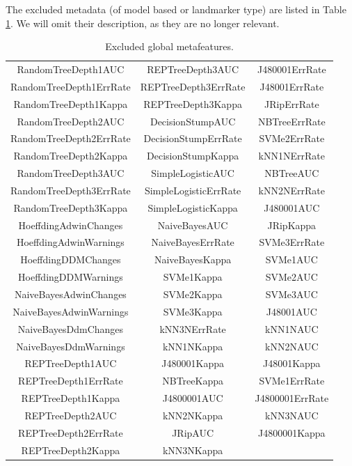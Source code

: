 The excluded metadata (of model based or landmarker type) are listed in Table \ref{table:excludedGlobalMetadata}. We will omit their description, as they are no longer relevant.

 \begin{table} 
 	\caption{Excluded global metafeatures.}
 	\label{table:excludedGlobalMetadata}
 	\centering 
 	\renewcommand{\arraystretch}{1.3}
 	\begin{tabular}{|c| c| c|} 	
 		\hline 	 
	 	RandomTreeDepth1AUC & REPTreeDepth3AUC & J480001ErrRate \\
	 	RandomTreeDepth1ErrRate & REPTreeDepth3ErrRate & J48001ErrRate \\
	 	RandomTreeDepth1Kappa & REPTreeDepth3Kappa & JRipErrRate \\
	 	RandomTreeDepth2AUC & DecisionStumpAUC & NBTreeErrRate \\
	 	RandomTreeDepth2ErrRate & DecisionStumpErrRate & SVMe2ErrRate \\
	 	RandomTreeDepth2Kappa & DecisionStumpKappa & kNN1NErrRate \\
	 	RandomTreeDepth3AUC & SimpleLogisticAUC & NBTreeAUC \\
	 	RandomTreeDepth3ErrRate & SimpleLogisticErrRate &  kNN2NErrRate\\
	 	RandomTreeDepth3Kappa & SimpleLogisticKappa & J480001AUC \\
	    HoeffdingAdwinChanges & NaiveBayesAUC  & JRipKappa \\
	    HoeffdingAdwinWarnings & NaiveBayesErrRate & SVMe3ErrRate \\
	    HoeffdingDDMChanges & NaiveBayesKappa  & SVMe1AUC \\
	    HoeffdingDDMWarnings & SVMe1Kappa & SVMe2AUC \\
	    NaiveBayesAdwinChanges & SVMe2Kappa & SVMe3AUC \\
	    NaiveBayesAdwinWarnings & SVMe3Kappa & J48001AUC \\
	    NaiveBayesDdmChanges & kNN3NErrRate & kNN1NAUC \\
	    NaiveBayesDdmWarnings & kNN1NKappa & kNN2NAUC \\
    	REPTreeDepth1AUC & J480001Kappa &  J48001Kappa\\
    	REPTreeDepth1ErrRate & NBTreeKappa & SVMe1ErrRate \\
    	REPTreeDepth1Kappa & J4800001AUC & J4800001ErrRate \\
	    REPTreeDepth2AUC & kNN2NKappa & kNN3NAUC \\
   	    REPTreeDepth2ErrRate & JRipAUC &  J4800001Kappa\\
   	    REPTreeDepth2Kappa & kNN3NKappa & \\
 		\hline 
 	\end{tabular}
 \end{table}  

